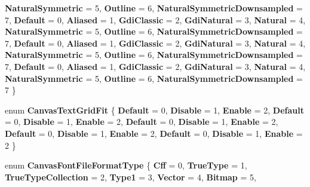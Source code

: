 \begin{DoxyCompactItemize}
{\bfseries Natural\+Symmetric} = 5, 
{\bfseries Outline} = 6, 
{\bfseries Natural\+Symmetric\+Downsampled} = 7, 
\newline
{\bfseries Default} = 0, 
{\bfseries Aliased} = 1, 
{\bfseries Gdi\+Classic} = 2, 
{\bfseries Gdi\+Natural} = 3, 
\newline
{\bfseries Natural} = 4, 
{\bfseries Natural\+Symmetric} = 5, 
{\bfseries Outline} = 6, 
{\bfseries Natural\+Symmetric\+Downsampled} = 7, 
\newline
{\bfseries Default} = 0, 
{\bfseries Aliased} = 1, 
{\bfseries Gdi\+Classic} = 2, 
{\bfseries Gdi\+Natural} = 3, 
\newline
{\bfseries Natural} = 4, 
{\bfseries Natural\+Symmetric} = 5, 
{\bfseries Outline} = 6, 
{\bfseries Natural\+Symmetric\+Downsampled} = 7, 
\newline
{\bfseries Default} = 0, 
{\bfseries Aliased} = 1, 
{\bfseries Gdi\+Classic} = 2, 
{\bfseries Gdi\+Natural} = 3, 
\newline
{\bfseries Natural} = 4, 
{\bfseries Natural\+Symmetric} = 5, 
{\bfseries Outline} = 6, 
{\bfseries Natural\+Symmetric\+Downsampled} = 7
 \}
\item 
\mbox{\label{namespace_microsoft_1_1_graphics_1_1_canvas_1_1_text_a7077d2f1ea9a72f9af3d69e5f5e04c20}} 
enum {\bfseries Canvas\+Text\+Grid\+Fit} \{ \newline
{\bfseries Default} = 0, 
{\bfseries Disable} = 1, 
{\bfseries Enable} = 2, 
{\bfseries Default} = 0, 
\newline
{\bfseries Disable} = 1, 
{\bfseries Enable} = 2, 
{\bfseries Default} = 0, 
{\bfseries Disable} = 1, 
\newline
{\bfseries Enable} = 2, 
{\bfseries Default} = 0, 
{\bfseries Disable} = 1, 
{\bfseries Enable} = 2, 
\newline
{\bfseries Default} = 0, 
{\bfseries Disable} = 1, 
{\bfseries Enable} = 2
 \}
\item 
\mbox{\label{namespace_microsoft_1_1_graphics_1_1_canvas_1_1_text_a70ea121d1ef956464e4adf30172f2a87}} 
enum {\bfseries Canvas\+Font\+File\+Format\+Type} \{ \newline
{\bfseries Cff} = 0, 
{\bfseries True\+Type} = 1, 
{\bfseries True\+Type\+Collection} = 2, 
{\bfseries Type1} = 3, 
\newline
{\bfseries Vector} = 4, 
{\bfseries Bitmap} = 5, 

\end{DoxyCompactItemize}
